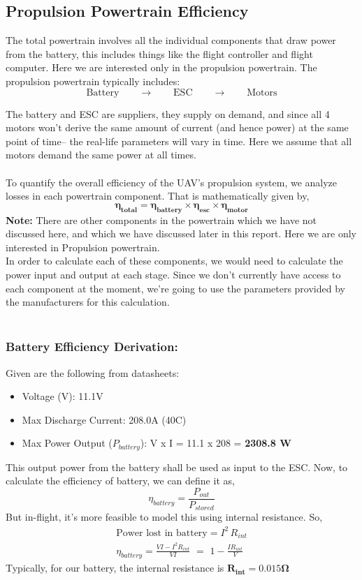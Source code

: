 \documentclass[12pt]{report}
\begin{document}
      \newpage
      \subsection{Propulsion Powertrain Efficiency}
      The total powertrain involves all the individual components that draw power from the battery, this includes things like the flight controller and flight computer. Here we are interested only in the propulsion powertrain. The propulsion powertrain typically includes: \[ \text{Battery} \quad \quad \rightarrow \quad \quad  \text{ESC} \quad \quad \rightarrow \quad \quad \text{Motors} \]

      The battery and ESC are suppliers, they supply on demand, and since all 4 motors won't derive the same amount of current (and hence power) at the same point of time-- the real-life parameters will vary in time. Here we assume that all motors demand the same power at all times.\\ \\ To quantify the overall efficiency of the UAV’s propulsion system, we analyze losses in each powertrain component. That is mathematically given by, 
      \[ 
      \boldsymbol{\eta_{total} = \eta_{battery} \times \eta_{esc} \times \eta_{motor}}
      \]
      \textbf{Note:} There are other components in the powertrain which we have not discussed here, and which we have discussed later in this report. Here we are only interested in Propulsion powertrain. \\

      In order to calculate each of these components, we would need to calculate the power input and output at each stage. Since we don't currently have access to each component at the moment, we're going to use the parameters provided by the manufacturers for this calculation. \\ \\
      \subsubsection{\large Battery Efficiency Derivation:}
      Given are the following from datasheets:
      \begin{itemize}
        \item Voltage (V): \hfill 11.1V
        \item Max Discharge Current: \hfill 208.0A (40C)
        \item Max Power Output ($ P_{battery} $): \hfill V x I = 11.1 x 208 = \textbf{2308.8 W}
      \end{itemize}
      This output power from the battery shall be used as input to the ESC. Now, to calculate the efficiency of battery, we can define it as, \[ \eta_{battery} = \frac{P_{out}}{P_{stored}} \] But in-flight, it's more feasible to model this using internal resistance. So, 
      \begin{gather*}
        \text{Power lost in battery} = I^2 \, R_{int} \\
        \eta_{battery} = \frac{VI - I^2 R_{int}}{VI} \,\, = \,\, 1 - \frac{IR_{int}}{V}
    \end{gather*}
    Typically, for our battery, the internal resistance is $ \boldsymbol{R_{int} = 0.015 \Omega} $
\end{document}
